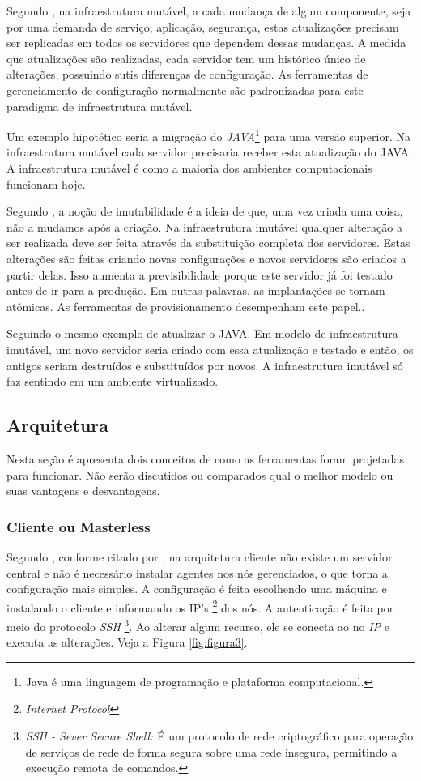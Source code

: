  Segundo , na infraestrutura mutável, a cada mudança de algum componente, seja por uma demanda de serviço, aplicação, segurança, estas atualizações precisam ser replicadas em todos os servidores que dependem dessas mudanças. A medida que atualizações são realizadas, cada servidor tem um histórico único de alterações, possuindo sutis diferenças de configuração. As ferramentas de gerenciamento de configuração normalmente são padronizadas para este paradigma de infraestrutura mutável. 
 
  Um exemplo hipotético seria a migração do \textit{JAVA}\footnote{Java é uma linguagem de programação e plataforma computacional.} para uma versão superior. Na infraestrutura mutável cada servidor precisaria receber esta atualização do JAVA. A infraestrutura mutável é como a maioria dos ambientes computacionais funcionam hoje.
 
 Segundo , a noção de imutabilidade é a ideia de que, uma vez criada uma coisa, não a mudamos após a criação.
 Na infraestrutura imutável qualquer alteração a ser realizada deve ser feita através da substituição completa dos servidores. Estas alterações são feitas criando novas configurações e novos servidores são criados a partir delas. Isso aumenta a previsibilidade porque este servidor já foi testado antes de ir para a produção. Em outras palavras, as implantações se tornam atômicas. As ferramentas de provisionamento desempenham este papel.\cite{Morris:2016:ICM:3006361}.
 
 Seguindo o mesmo exemplo de atualizar o JAVA. Em modelo de infraestrutura imutável, um novo servidor seria criado com essa atualização e testado e então, os antigos seriam destruídos e substituídos por novos. A infraestrutura imutável só faz sentindo em um ambiente virtualizado. 
 
\subsection{Arquitetura}

Nesta seção é apresenta dois conceitos de como as ferramentas foram projetadas para funcionar. Não serão discutidos ou comparados qual o melhor modelo ou suas vantagens e desvantagens. 

\subsubsection{Cliente ou Masterless} \label{semagent}
Segundo , conforme citado por , na arquitetura cliente não existe um servidor central e não é necessário instalar agentes nos nós gerenciados, o que torna a configuração mais simples. A configuração é feita escolhendo uma máquina e instalando o cliente e informando os IP's \footnote{\textit{Internet Protocol}} dos nós. A autenticação é feita por meio do protocolo \textit{SSH} \footnote{\textit{SSH - Sever Secure Shell:}  É um protocolo de rede criptográfico para operação de serviços de rede de forma segura sobre uma rede insegura, permitindo a execução remota de comandos.}. Ao alterar algum recurso, ele se conecta ao no \textit{IP} e executa as alterações. Veja a Figura  \ref{fig:figura3}. 

